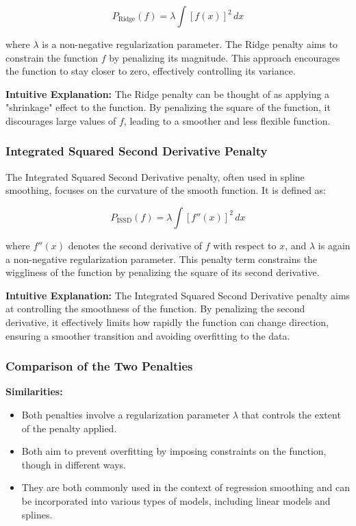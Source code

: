 \documentclass[12pt, twoside,hidelinks]{article}
\theoremstyle{definition}
\numberwithin{equation}{section}
\begin{document}
\begin{equation}
    P_{\text{Ridge}}(f) = \lambda \int [f(x)]^2 \, dx
\end{equation}

where \( \lambda \) is a non-negative regularization parameter. The Ridge penalty aims to constrain the function \( f \) by penalizing its magnitude. This approach encourages the function to stay closer to zero, effectively controlling its variance.

\textbf{Intuitive Explanation:} The Ridge penalty can be thought of as applying a "shrinkage" effect to the function. By penalizing the square of the function, it discourages large values of \( f \), leading to a smoother and less flexible function.

\subsubsection*{Integrated Squared Second Derivative Penalty}

The Integrated Squared Second Derivative penalty, often used in spline smoothing, focuses on the curvature of the smooth function. It is defined as:

\begin{equation}
    P_{\text{ISSD}}(f) = \lambda \int [f''(x)]^2 \, dx
\end{equation}

where \( f''(x) \) denotes the second derivative of \( f \) with respect to \( x \), and \( \lambda \) is again a non-negative regularization parameter. This penalty term constrains the wiggliness of the function by penalizing the square of its second derivative.

\textbf{Intuitive Explanation:} The Integrated Squared Second Derivative penalty aims at controlling the smoothness of the function. By penalizing the second derivative, it effectively limits how rapidly the function can change direction, ensuring a smoother transition and avoiding overfitting to the data.

\subsubsection*{Comparison of the Two Penalties}

\textbf{Similarities:}
\begin{itemize}
    \item Both penalties involve a regularization parameter \( \lambda \) that controls the extent of the penalty applied.
    \item Both aim to prevent overfitting by imposing constraints on the function, though in different ways.
    \item They are both commonly used in the context of regression smoothing and can be incorporated into various types of models, including linear models and splines.
\end{itemize}
\end{document}
